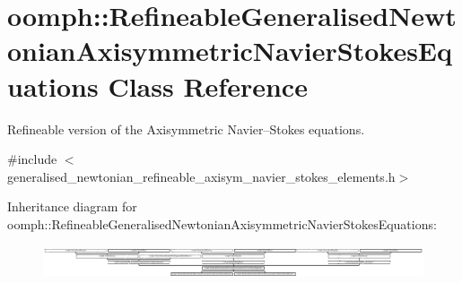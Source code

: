 \hypertarget{classoomph_1_1RefineableGeneralisedNewtonianAxisymmetricNavierStokesEquations}{}\section{oomph\+:\+:Refineable\+Generalised\+Newtonian\+Axisymmetric\+Navier\+Stokes\+Equations Class Reference}
\label{classoomph_1_1RefineableGeneralisedNewtonianAxisymmetricNavierStokesEquations}


Refineable version of the Axisymmetric Navier--Stokes equations.  




{\ttfamily \#include $<$generalised\+\_\+newtonian\+\_\+refineable\+\_\+axisym\+\_\+navier\+\_\+stokes\+\_\+elements.\+h$>$}

Inheritance diagram for oomph\+:\+:Refineable\+Generalised\+Newtonian\+Axisymmetric\+Navier\+Stokes\+Equations\+:\begin{figure}[H]
\begin{center}
\leavevmode
\includegraphics[height=0.997151cm]{classoomph_1_1RefineableGeneralisedNewtonianAxisymmetricNavierStokesEquations}
\end{center}
\end{figure}

